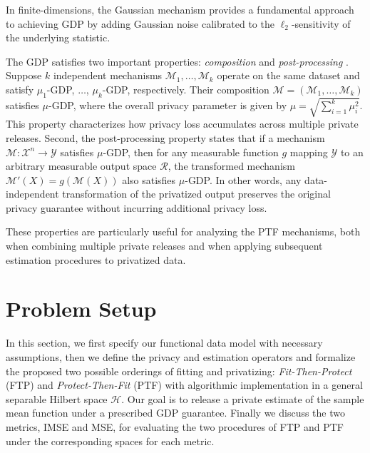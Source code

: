\documentclass[twoside,11pt]{article}
\begin{document}
In finite-dimensions, the Gaussian mechanism provides a fundamental approach to achieving GDP by adding Gaussian noise calibrated to the $\ell_2$-sensitivity of the underlying statistic. 

The GDP satisfies two important properties: \emph{composition} and \emph{post-processing} \citep{dong2022gaussian}. Suppose $k$ independent mechanisms $\mathcal{M}_1,\ldots,\mathcal{M}_k$ operate on the same dataset and satisfy $\mu_1$-GDP, $\ldots$, $\mu_k$-GDP, respectively. Their composition $\mathcal{M}=(\mathcal{M}_1,\ldots,\mathcal{M}_k)$ satisfies $\mu$-GDP, where the overall privacy parameter is given by $\mu=\sqrt{\sum_{i=1}^{k}\mu_i^2}$. This property characterizes how privacy loss accumulates across multiple private releases. Second, the post-processing property states that if a mechanism $\mathcal{M}:\mathcal{X}^n\to\mathcal{Y}$ satisfies $\mu$-GDP, then for any measurable function $g$ mapping $\mathcal{Y}$ to an arbitrary measurable output space $\mathcal{R}$, the transformed mechanism $\mathcal{M}'(X)=g(\mathcal{M}(X))$ also satisfies $\mu$-GDP. In other words, any data-independent transformation of the privatized output preserves the original privacy guarantee without incurring additional privacy loss. 

These properties are particularly useful for analyzing the PTF mechanisms, both when combining multiple private releases and when applying subsequent estimation procedures to privatized data.

\section{Problem Setup}
\label{sec: Problem Setup}
In this section, we first specify our functional data model with necessary assumptions, then we define the privacy and estimation operators and formalize the proposed two possible orderings of fitting and privatizing: \emph{Fit-Then-Protect} (FTP) and \emph{Protect-Then-Fit} (PTF) with algorithmic implementation in a general separable Hilbert space $\mathcal{H}$. Our goal is to release a private estimate of the sample mean function under a prescribed GDP guarantee. Finally we discuss the two metrics, IMSE and MSE, for evaluating the two procedures of FTP and PTF under the corresponding spaces for each metric.
\end{document}
